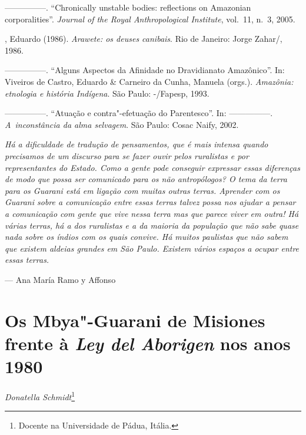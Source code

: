 \begin{Parskip}
—————. ``Chronically unstable bodies: reflections on Amazonian
corporalities''. \emph{Journal of the Royal Anthropological Institute}, vol.~11, n.~3,
2005.

, Eduardo (1986). \emph{Arawete: os deuses canibais}. Rio de
Janeiro: Jorge Zahar/, 1986.

—————. ``Alguns Aspectos da Afinidade no Dravidianato Amazônico''. In:
Viveiros de Castro, Eduardo \& Carneiro da Cunha, Manuela (orgs.).
\emph{Amazônia: etnologia e história Indígena}. São Paulo: -/Fapesp,
1993.

—————. ``Atuação e contra"-efetuação do Parentesco''. In: —————. \emph{A~inconstância da
alma selvagem}. São Paulo: Cosac Naify, 2002.
\end{Parskip}

\clearpage

\vspace*{\fill}

\begin{flushleft}
\begin{minipage}[c]{0.85\textwidth}
\raggedright
\footnotesize
\emph{Há a dificuldade de tradução de pensamentos, que é mais intensa quando
precisamos de um discurso para se fazer ouvir pelos ruralistas e por
representantes do Estado. Como a gente pode conseguir expressar essas
diferenças de modo que possa ser comunicado para os não antropólogos? O
tema da terra para os Guarani está em ligação com muitas outras terras.
Aprender com os Guarani sobre a comunicação entre essas terras talvez
possa nos ajudar a pensar a comunicação com gente que vive nessa terra
mas que parece viver em outra! Há várias terras, há a dos ruralistas e
a da maioria da população que não sabe quase nada sobre os índios com
os quais convive. Há muitos paulistas que não sabem que existem aldeias
grandes em São Paulo. Existem vários espaços a ocupar entre essas
terras.}

\smallskip
\hspace*{\fill}--- Ana María Ramo y Affonso
\end{minipage}
\end{flushleft}

\chapter{Os Mbya"-Guarani de Misiones frente à \emph{Ley del Aborigen} nos anos 1980}
\begin{flushright}
\emph{Donatella Schmidt}\footnote{Docente na Universidade de Pádua, Itália.}
\end{flushright}
\medskip

